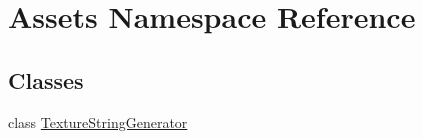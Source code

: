 \hypertarget{namespace_assets}{}\section{Assets Namespace Reference}
\label{namespace_assets}
\subsection*{Classes}
\begin{DoxyCompactItemize}
\item 
class \mbox{\hyperlink{class_assets_1_1_texture_string_generator}{Texture\+String\+Generator}}
\end{DoxyCompactItemize}
